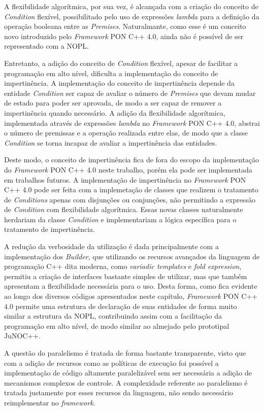 A flexibilidade algorítmica, por sua vez, é alcançada com a criação do conceito
de \textit{Condition} flexível, possibilitado pelo uso de expressões
\textit{lambda} para a definição da operação booleana entre as
\textit{Premises}. Naturalmante, como esse é um conceito novo introduzido pelo
\textit{Framework} PON C++ 4.0, ainda não é possível de ser representado com a
NOPL.

Entretanto, a adição do conceito de \textit{Condition} flexível, apesar de
facilitar a programação em alto nível, dificulta a implementação do conceito de
impertinência. A implementação do conceito de impertinência depende da entidade
\textit{Condition} ser capaz de avaliar o número de \textit{Premises} que devam
mudar de estado para poder ser aprovada, de modo a ser capaz de remover a
impertinência quando necessário. A adição da flexibilidade algorítmica,
implementada através de expressões \textit{lambda} no \textit{Framework} PON C++
4.0, abstrai o número de premissas e a operação realizada entre elas, de modo
que a classe \textit{Condition} se torna incapaz de avaliar a impertinência das
entidades.

Deste modo, o conceito de impertinência fica de fora do escopo da implementação
do \textit{Framework} PON C++ 4.0 neste trabalho, porém ela pode ser
implementada em trabalhos futuros. A implementação de impertinência no
\textit{Framework} PON C++ 4.0 pode ser feita com a implemetação de classes que
realizem o tratamento de \textit{Conditions} apenas com disjunções ou
conjunções, não permitindo a expressão de \textit{Condition} com flexibilidade
algorítmica. Essas novas classes naturalmente herdariam da classe
\textit{Condition} e implementariam a lógica específica para o tratamento de
impertinência.

A redução da verbosidade da utilização é dada principalmente com a implementação
dos \textit{Builder}, que utilizando os recursos avançados da linguagem de
programação C++ dita moderna, como \textit{variadic templates} e \textit{fold
expression}, permitiu a criação de interfaces bastante simples de utilizar, mas
que também apresentam a flexibilidade necessária para o uso. Desta forma, como
fica evidente ao longo dos diversos códigos apresentados neste capítulo,
\textit{Framework} PON C++ 4.0 permite uma estrutura de declaração de suas
entidades de forma muito similar a estrutura da NOPL, contribuindo assim com a
facilitação da programação em alto nível, de modo similar ao almejado pelo
prototipal JuNOC++.

A questão do paralelismo é tratada de forma bastante transparente,
visto que com a adição de recursos como as políticas de execução foi possível a
implementação de código altamente paralelizável sem ser necessária a adição de
mecanismos complexos de controle. A complexidade referente ao paralelismo é
tratada justamente por esses recursos da linguagem, não sendo necessário
reimplementar no \textit{framework}.


